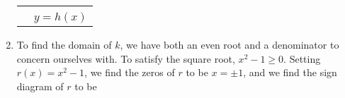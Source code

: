 \documentclass[12pt]{ximera}
\begin{document}
\begin{example}
\begin{enumerate}
\begin{tabular}{m{2.5in}c}









&

 \\ 

& $y=h(x)$ \\

\end{tabular}

\item  To find the domain of $k$, we have both an even root and a denominator to concern ourselves with.  To satisfy the square root, $x^2 - 1 \geq 0$.  Setting $r(x) = x^2-1$, we find the zeros of $r$ to be $x = \pm 1$, and we find the sign diagram of $r$ to be


\begin{center}













\end{center}


\end{enumerate}
\end{example}
\end{document}
